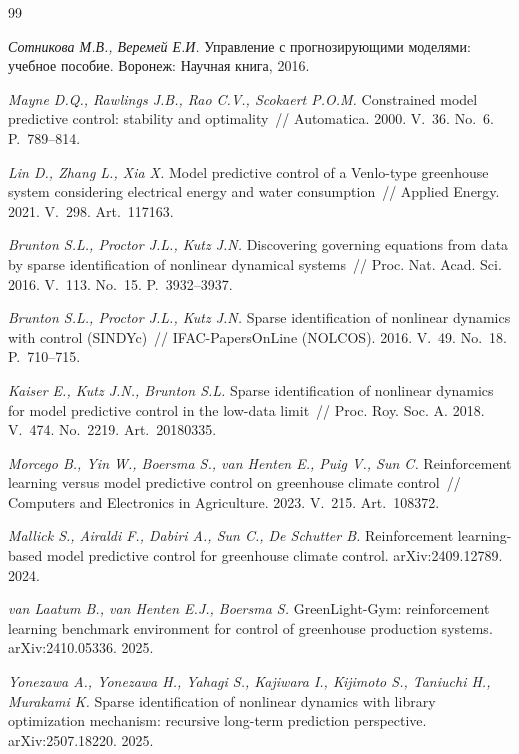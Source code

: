 \documentclass[12pt,a4paper,leqno]{article}
\begin{document}
\begin{thebibliography}{99}
\small

\textit{Сотникова М.В., Веремей Е.И.} Управление с прогнозирующими моделями: учебное
пособие. Воронеж: Научная книга, 2016.

\textit{Mayne D.Q., Rawlings J.B., Rao C.V., Scokaert P.O.M.} Constrained model
predictive control: stability and optimality~// Automatica. 2000. V.~36. No.~6.
P.~789--814.

\textit{Lin D., Zhang L., Xia X.} Model predictive control of a Venlo-type greenhouse
system considering electrical energy and water consumption~// Applied Energy. 2021.
V.~298. Art.~117163.

\textit{Brunton S.L., Proctor J.L., Kutz J.N.} Discovering governing equations from
data by sparse identification of nonlinear dynamical systems~// Proc. Nat. Acad. Sci.
2016. V.~113. No.~15. P.~3932--3937.

\textit{Brunton S.L., Proctor J.L., Kutz J.N.} Sparse identification of nonlinear
dynamics with control (SINDYc)~// IFAC-PapersOnLine (NOLCOS). 2016. V.~49. No.~18.
P.~710--715.

\textit{Kaiser E., Kutz J.N., Brunton S.L.} Sparse identification of nonlinear dynamics
for model predictive control in the low-data limit~// Proc. Roy. Soc. A. 2018. V.~474.
No.~2219. Art.~20180335.

\textit{Morcego B., Yin W., Boersma S., van Henten E., Puig V., Sun C.} Reinforcement
learning versus model predictive control on greenhouse climate control~// Computers and
Electronics in Agriculture. 2023. V.~215. Art.~108372.

\textit{Mallick S., Airaldi F., Dabiri A., Sun C., De Schutter B.} Reinforcement
learning-based model predictive control for greenhouse climate control.
arXiv:2409.12789. 2024.

\textit{van Laatum B., van Henten E.J., Boersma S.} GreenLight-Gym: reinforcement
learning benchmark environment for control of greenhouse production systems.
arXiv:2410.05336. 2025.

\textit{Yonezawa A., Yonezawa H., Yahagi S., Kajiwara I., Kijimoto S., Taniuchi H.,
Murakami K.} Sparse identification of nonlinear dynamics with library optimization
mechanism: recursive long-term prediction perspective. arXiv:2507.18220. 2025.


\end{thebibliography}
\end{document}
